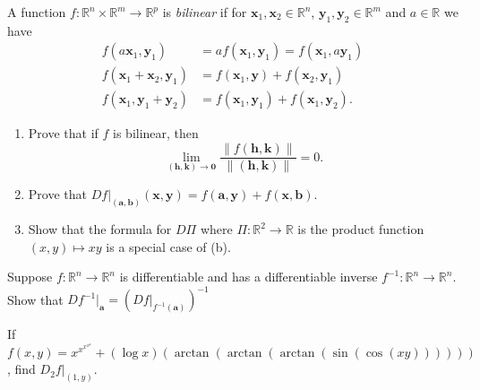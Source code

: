 \documentclass[12 pt, letterpaper]{hmcpset}
\begin{document}
\begin{problem}[12.]
	A function $f : \mathbb{R}^{n} \times \mathbb{R}^{m} \to \mathbb{R}^{p}$ is \textit{bilinear} if for $\mathbf{x}_{1}, \mathbf{x}_{2} \in \mathbb{R}^{n}$, $\mathbf{y}_{1}, \mathbf{y}_{2} \in \mathbb{R}^{m}$ and $a \in \mathbb{R}$ we have
	\[
		\begin{split}
			f(a \mathbf{x}_{1}, \mathbf{y}_{1}) & = a f(\mathbf{x}_{1}, \mathbf{y}_{1}) = f(\mathbf{x}_{1}, a \mathbf{y}_{1}) \\
			f(\mathbf{x}_{1} + \mathbf{x}_{2}, \mathbf{y}_{1}) & = f(\mathbf{x}_{1}, \mathbf{y}) + f(\mathbf{x}_{2}, \mathbf{y}_{1}) \\
			f(\mathbf{x}_{1}, \mathbf{y}_{1} + \mathbf{y}_{2}) & = f(\mathbf{x}_{1}, \mathbf{y}_{1}) + f(\mathbf{x}_{1}, \mathbf{y}_{2}).
		\end{split}
	\]
	\begin{enumerate}
		\item Prove that if $f$ is bilinear, then
			\[
				\lim_{(\mathbf{h}, \mathbf{k}) \to \mathbf{0}} \frac{\lVert f(\mathbf{h}, \mathbf{k}) \rVert}{\lVert (\mathbf{h}, \mathbf{k}) \rVert} = 0.
			\]
		\item Prove that $Df \Big |_{(\mathbf{a}, \mathbf{b})} (\mathbf{x}, \mathbf{y}) = f(\mathbf{a}, \mathbf{y}) + f(\mathbf{x}, \mathbf{b})$.
		\item Show that the formula for $D \Pi$ where $\Pi : \mathbb{R}^{2} \to \mathbb{R}$ is the product function $(x, y) \mapsto xy$ is a special case of (b).
	\end{enumerate}
\end{problem}

\pagebreak

\begin{problem}[16.]
	Suppose $f : \mathbb{R}^{n} \to \mathbb{R}^{n}$ is differentiable and has a differentiable inverse $f^{-1} : \mathbb{R}^{n} \to \mathbb{R}^{n}$. Show that $D f^{-1} \Big |_{\mathbf{a}} = (Df \Big |_{f^{-1}(\mathbf{a})})^{-1}$
\end{problem}

\pagebreak

\begin{problem}[19.]
	If $f(x, y) = x^{x^{x^{x^{y}}}} + (\log x)(\arctan{(\arctan{(\arctan{(\sin{(\cos{(xy)})})})})})$, find $D_{2} f \Big |_{(1, y)}$.
\end{problem}

\pagebreak
\end{document}
